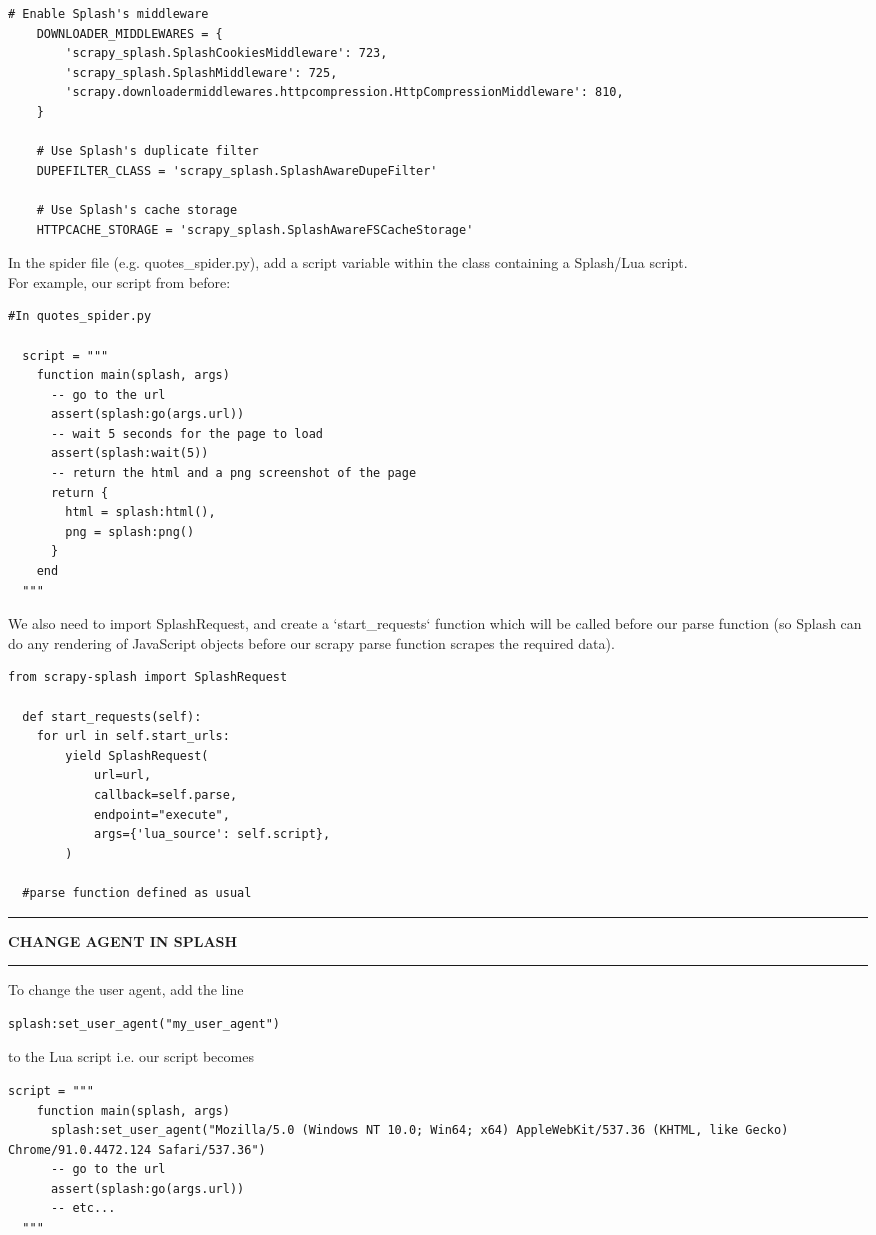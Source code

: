 \documentclass[8pt]{extarticle}
\newcommand{\heading}[1]{%
    \noindent
    \rule{\linewidth}{0.4pt}
    \begin{center}
        \vspace{-1ex}
        \textbf{#1}        
        \vspace{-2.5ex}
    \end{center}
    \rule{\linewidth}{0.4pt}
}
\begin{document}
\begin{multicols}{3}
\begin{lstlisting}[style=python]
    # Enable Splash's middleware
    DOWNLOADER_MIDDLEWARES = {
        'scrapy_splash.SplashCookiesMiddleware': 723,
        'scrapy_splash.SplashMiddleware': 725,
        'scrapy.downloadermiddlewares.httpcompression.HttpCompressionMiddleware': 810,
    }
    
    # Use Splash's duplicate filter
    DUPEFILTER_CLASS = 'scrapy_splash.SplashAwareDupeFilter'
    
    # Use Splash's cache storage
    HTTPCACHE_STORAGE = 'scrapy_splash.SplashAwareFSCacheStorage'
\end{lstlisting}

In the spider file (e.g. quotes\_spider.py), add a script variable within the class containing a Splash/Lua script.\\

For example, our script from before: 
\begin{lstlisting}[style=python]
  #In quotes_spider.py 
  
  script = """
    function main(splash, args)
      -- go to the url
      assert(splash:go(args.url))
      -- wait 5 seconds for the page to load
      assert(splash:wait(5))
      -- return the html and a png screenshot of the page
      return {
        html = splash:html(),
        png = splash:png()
      }
    end
  """
\end{lstlisting}

We also need to import SplashRequest, and create a `start\_requests` function which will be called before our parse function (so Splash can do any rendering of JavaScript objects before our scrapy parse function scrapes the required data).

\begin{lstlisting}[style=python]
  from scrapy-splash import SplashRequest

  def start_requests(self):
    for url in self.start_urls:
        yield SplashRequest(
            url=url,
            callback=self.parse,
            endpoint="execute",
            args={'lua_source': self.script},
        )

  #parse function defined as usual
\end{lstlisting}

\heading{CHANGE AGENT IN SPLASH}

To change the user agent, add the line 
\begin{lstlisting}[style=python]
    splash:set_user_agent("my_user_agent")
\end{lstlisting}
to the Lua script i.e. our script becomes
\begin{lstlisting}[style=python]  
  script = """
    function main(splash, args)
      splash:set_user_agent("Mozilla/5.0 (Windows NT 10.0; Win64; x64) AppleWebKit/537.36 (KHTML, like Gecko) Chrome/91.0.4472.124 Safari/537.36")
      -- go to the url
      assert(splash:go(args.url))
      -- etc...
  """
\end{lstlisting}

\newpage
\end{multicols}
\end{document}
